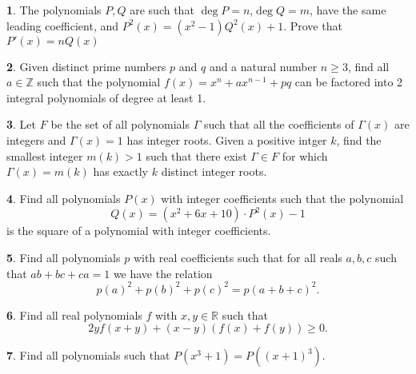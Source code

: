 \documentclass{article}
\theoremstyle{definition}
\newtheorem{p}{}
\begin{document}
\begin{p}
The polynomials $P,Q$ are such that $\deg P=n$,$\deg Q=m$, have the same leading coefficient, and $P^2(x)=(x^2-1)Q^2(x)+1$. Prove that $P'(x)=nQ(x)$
\end{p}





\begin{p}
Given distinct prime numbers $p$ and $q$ and a natural number $n \geq 3$, find all $a \in \mathbb{Z}$ such that the polynomial $f(x) = x^n + ax^{n-1} + pq$ can be factored into 2 integral polynomials of degree at least 1.
\end{p}





\begin{p}
Let $F$ be the set of all polynomials $\Gamma$ such that all the coefficients of $\Gamma (x)$ are integers and $\Gamma (x) = 1$ has integer roots. Given a positive intger $k$, find the smallest integer $m(k) > 1$ such that there exist $\Gamma \in F$ for which $\Gamma (x) = m(k)$ has exactly $k$ distinct integer roots.
\end{p}





\begin{p}
Find all polynomials $P(x)$ with integer coefficients such that the polynomial \[ Q(x)=(x^2+6x+10) \cdot P^2(x)-1 \] is the square of a polynomial with integer coefficients.
\end{p}





\begin{p}
Find all polynomials $p$ with real coefficients such that for all reals $a, b ,c$ such that $ab+bc+ca =1$ we have the relation \[p(a)^{2}+p(b)^{2}+p(c)^{2}=p(a+b+c)^{2}.\]
\end{p}





\begin{p}
Find all real polynomials $ f$ with $ x,y \in \mathbb{R}$ such that
\[ 2 y f(x + y) + (x - y)(f(x) + f(y)) \geq 0.\]
\end{p}





\begin{p}
Find all polynomials such that $P(x^3+1) = P((x+1)^3)$.
\end{p}
\end{document}
